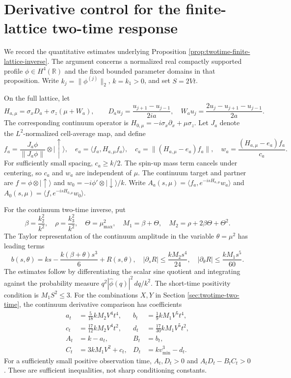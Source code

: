 \documentclass[11pt]{article}
\theoremstyle{definition}
\begin{document}
\section{Derivative control for the finite-lattice two-time response}
\label{app:finite-lattice-proof}
We record the quantitative estimates underlying Proposition
\ref{prop:twotime-finite-lattice-inverse}. The argument concerns a normalized
real compactly supported profile $\phi\in H^4(\mathbb R)$ and the fixed
bounded parameter domains in that proposition. Write
$k_j=\|\phi^{(j)}\|_2$, $k=k_1>0$, and set $S=2Vt$.

On the full lattice, let
\[
 H_{a,\mu}=\sigma_xD_a+\sigma_z(\mu+W_a),\qquad
 D_au_j=\frac{u_{j+1}-u_{j-1}}{2ia},\quad
 W_au_j=\frac{2u_j-u_{j+1}-u_{j-1}}{2a}.
\]
The corresponding continuum operator is
$H_{0,\mu}=-i\sigma_x\partial_x+\mu\sigma_z$.
Let $J_a$ denote the $L^2$-normalized cell-average map, and define
\[
 f_a=\frac{J_a\phi}{\|J_a\phi\|}\otimes|\uparrow\rangle,
 \quad e_a=\langle f_a,H_{a,\mu}f_a\rangle,
 \quad c_a=\|(H_{a,\mu}-e_a)f_a\|,
 \quad w_a=\frac{(H_{a,\mu}-e_a)f_a}{c_a}.
\]
For sufficiently small spacing, $c_a\ge k/2$.
The spin-up mass term cancels under centering, so $c_a$ and $w_a$
are independent of $\mu$. The continuum target and partner are
$f=\phi\otimes|\uparrow\rangle$ and
$w_0=-i\phi'\otimes|\downarrow\rangle/k$.
Write $A_a(s,\mu)=\langle f_a,e^{-isH_{a,\mu}}w_a\rangle$ and
$A_0(s,\mu)=\langle f,e^{-isH_{0,\mu}}w_0\rangle$.

For the continuum two-time inverse, put
\[
 \beta=\frac{k_2^2}{k^2},\quad \rho=\frac{k_3^2}{k^2},\quad
 \Theta=\mu_{\max}^2,\quad M_1=\beta+\Theta,\quad
 M_2=\rho+2\beta\Theta+\Theta^2.
\]
The Taylor representation of the continuum amplitude in the variable
$\theta=\mu^2$ has leading terms
\[
 b(s,\theta)=ks-\frac{k(\beta+\theta)s^3}{6}+R(s,\theta),
 \quad |\partial_s R|\le\frac{kM_2s^4}{24},\quad
 |\partial_\theta R|\le\frac{kM_1s^5}{60}.
\]
The estimates follow by differentiating the scalar sine quotient and
integrating against the probability measure
$q^2|\widehat\phi(q)|^2\,dq/k^2$. The short-time positivity
condition is $M_1S^2\le3$.
For the combinations $X,Y$ in Section \ref{sec:twotime-two-time}, the
continuum derivative comparison has coefficients
\begin{align*}
 a_t&=\tfrac5{18}kM_2V^4t^4,&
 b_t&=\tfrac19kM_1V^5t^4,\\
 c_t&=\tfrac{17}{12}kM_2V^4t^2,&
 d_t&=\tfrac{17}{30}kM_1V^5t^2,\\
 A_t&=k-a_t,& B_t&=b_t,\\
 C_t&=3kM_1V^2+c_t,& D_t&=kv_{\min}^3-d_t.
\end{align*}
For a sufficiently small positive observation time,
$A_t,D_t>0$ and $A_tD_t-B_tC_t>0$.
These are sufficient inequalities, not sharp conditioning constants.
\end{document}
